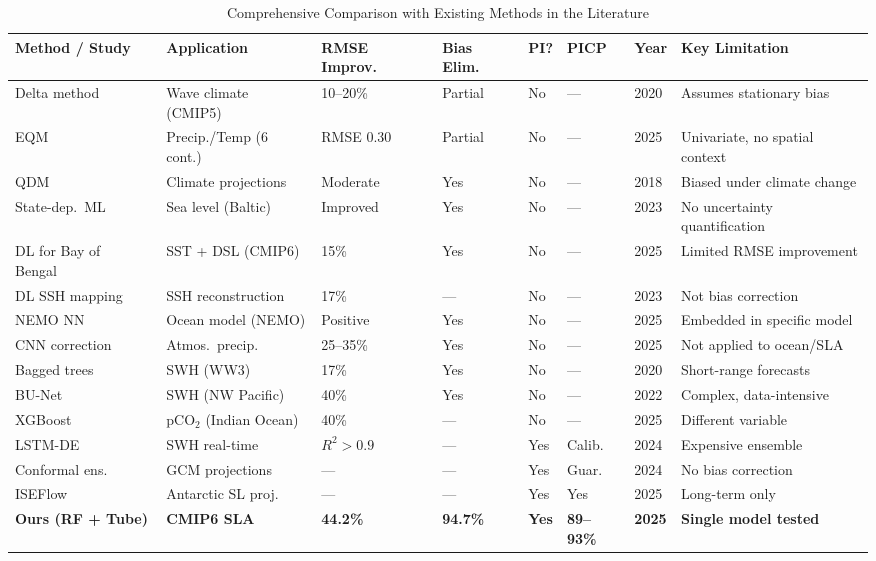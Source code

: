 \documentclass[conference]{IEEEtran}
\begin{document}
\begin{table}[t]
\centering
\caption{Comprehensive Comparison with Existing Methods in the Literature}
\label{tab:lit_comparison}
\begin{tabular}{@{}p{2.8cm}p{2.4cm}p{1.4cm}p{1.2cm}p{0.8cm}p{1.2cm}p{1.0cm}p{2.8cm}@{}}
\toprule
\textbf{Method / Study} & \textbf{Application} & \textbf{RMSE Improv.} & \textbf{Bias Elim.} & \textbf{PI?} & \textbf{PICP} & \textbf{Year} & \textbf{Key Limitation} \\
\midrule
Delta method~\cite{lemos2020} & Wave climate (CMIP5) & 10--20\% & Partial & No & --- & 2020 & Assumes stationary bias \\
EQM~\cite{intercomp2025} & Precip./Temp (6 cont.) & RMSE 0.30 & Partial & No & --- & 2025 & Univariate, no spatial context \\
QDM~\cite{cannon2018} & Climate projections & Moderate & Yes & No & --- & 2018 & Biased under climate change \\
State-dep.~ML~\cite{doganay2023} & Sea level (Baltic) & Improved & Yes & No & --- & 2023 & No uncertainty quantification \\
DL for Bay of Bengal~\cite{pasula2025} & SST + DSL (CMIP6) & 15\% & Yes & No & --- & 2025 & Limited RMSE improvement \\
DL SSH mapping~\cite{martin2023} & SSH reconstruction & 17\% & --- & No & --- & 2023 & Not bias correction \\
NEMO NN~\cite{guillou2025} & Ocean model (NEMO) & Positive & Yes & No & --- & 2025 & Embedded in specific model \\
CNN correction~\cite{chapman2025} & Atmos.\ precip. & 25--35\% & Yes & No & --- & 2025 & Not applied to ocean/SLA \\
Bagged trees~\cite{ellenson2020} & SWH (WW3) & 17\% & Yes & No & --- & 2020 & Short-range forecasts \\
BU-Net~\cite{sun2022} & SWH (NW Pacific) & 40\% & Yes & No & --- & 2022 & Complex, data-intensive \\
XGBoost~\cite{pco2_2025} & pCO$_2$ (Indian Ocean) & 40\% & --- & No & --- & 2025 & Different variable \\
LSTM-DE~\cite{patel2024} & SWH real-time & $R^2>0.9$ & --- & Yes & Calib. & 2024 & Expensive ensemble \\
Conformal ens.~\cite{bassetti2024} & GCM projections & --- & --- & Yes & Guar. & 2024 & No bias correction \\
ISEFlow~\cite{gregory2024} & Antarctic SL proj. & --- & --- & Yes & Yes & 2025 & Long-term only \\
\midrule
\textbf{Ours (RF + Tube)} & \textbf{CMIP6 SLA} & \textbf{44.2\%} & \textbf{94.7\%} & \textbf{Yes} & \textbf{89--93\%} & \textbf{2025} & \textbf{Single model tested} \\
\bottomrule
\end{tabular}
\end{table}
\end{document}
